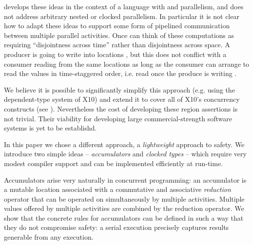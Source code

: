 \cite{DPJ} develops these ideas in the context of a language with
 and  parallelism, and does not
address arbitrary nested or clocked parallelism.  In particular it is
not clear how to adapt these ideas to support some form of pipelined
communication between multiple parallel activities. Once can think of
these computations as requiring ``disjointness across time'' rather
than disjointness across space. A producer is going to write into
locations , but this does not
conflict with a consumer reading from the same locations as long as
the consumer can arrange to read the values in time-staggered order,
i.e. read  once the produce is writing .

We believe it is possible to significantly simplify this approach
(e.g.{} using the dependent-type system of X10) and extend it to cover
all of X10's concurrency constructs (see
). Nevertheless the cost of developing these
region assertions is not trivial. Their viability for developing large
commercial-strength software systems is yet to be establishd.

In this paper we chose a different approach, a {\em lightweight}
approach to safety. We introduce two simple ideas -- {\em
  accumulators} and {\em clocked types} -- which require very modest
compiler support and can be implemented efficiently at run-time.

Accumulators arise very naturally in concurrent programming: an
accumulator is a mutable location associated with a commutative and
associative {\em reduction} operator that can be operated on
simultaneously by multiple activities. Multiple values offered by
multiple activities are combined by the reduction operator. We show
that the concrete rules for accumulators can be defined in such a way
that they do not compromise safety: a serial execution precisely
captures results generable from any execution.

